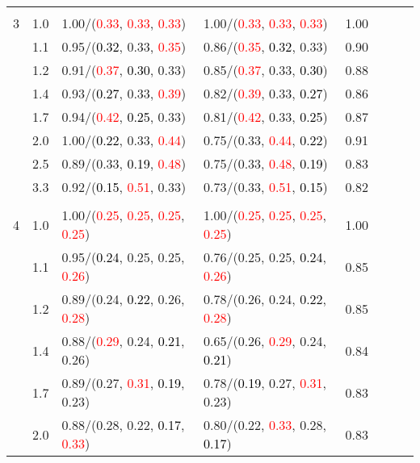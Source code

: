 \documentclass[10pt,a4paper]{report}
\begin{document}
\begin{table}[!htbp]
\begin{center}
{\begin{tabular}{ccllcccc}
			&&&&\\
			3			&1.0&1.00/(\textcolor{red}{0.33}, \textcolor{red}{0.33}, \textcolor{red}{0.33})&1.00/(\textcolor{red}{0.33}, \textcolor{red}{0.33}, \textcolor{red}{0.33})&1.00\\
			&1.1&0.95/(\textcolor{black}{0.32}, 0.33, \textcolor{red}{0.35})&0.86/(\textcolor{red}{0.35}, \textcolor{black}{0.32}, 0.33)&0.90\\
			&1.2&0.91/(\textcolor{red}{0.37}, \textcolor{black}{0.30}, 0.33)&0.85/(\textcolor{red}{0.37}, 0.33, \textcolor{black}{0.30})&0.88\\
			&1.4&0.93/(\textcolor{black}{0.27}, 0.33, \textcolor{red}{0.39})&0.82/(\textcolor{red}{0.39}, 0.33, \textcolor{black}{0.27})&0.86\\
			&1.7&0.94/(\textcolor{red}{0.42}, \textcolor{black}{0.25}, 0.33)&0.81/(\textcolor{red}{0.42}, 0.33, \textcolor{black}{0.25})&0.87\\
			&2.0&1.00/(\textcolor{black}{0.22}, 0.33, \textcolor{red}{0.44})&0.75/(0.33, \textcolor{red}{0.44}, \textcolor{black}{0.22})&0.91\\
			&2.5&0.89/(0.33, \textcolor{black}{0.19}, \textcolor{red}{0.48})&0.75/(0.33, \textcolor{red}{0.48}, \textcolor{black}{0.19})&0.83\\
			&3.3&0.92/(\textcolor{black}{0.15}, \textcolor{red}{0.51}, 0.33)&0.73/(0.33, \textcolor{red}{0.51}, \textcolor{black}{0.15})&0.82\\
			&&&&\\
			4			&1.0&1.00/(\textcolor{red}{0.25}, \textcolor{red}{0.25}, \textcolor{red}{0.25}, \textcolor{red}{0.25})&1.00/(\textcolor{red}{0.25}, \textcolor{red}{0.25}, \textcolor{red}{0.25}, \textcolor{red}{0.25})&1.00\\
			&1.1&0.95/(\textcolor{black}{0.24}, 0.25, 0.25, \textcolor{red}{0.26})&0.76/(0.25, 0.25, \textcolor{black}{0.24}, \textcolor{red}{0.26})&0.85\\
			&1.2&0.89/(0.24, \textcolor{black}{0.22}, 0.26, \textcolor{red}{0.28})&0.78/(0.26, 0.24, \textcolor{black}{0.22}, \textcolor{red}{0.28})&0.85\\
			&1.4&0.88/(\textcolor{red}{0.29}, 0.24, \textcolor{black}{0.21}, 0.26)&0.65/(0.26, \textcolor{red}{0.29}, 0.24, \textcolor{black}{0.21})&0.84\\
			&1.7&0.89/(0.27, \textcolor{red}{0.31}, \textcolor{black}{0.19}, 0.23)&0.78/(\textcolor{black}{0.19}, 0.27, \textcolor{red}{0.31}, 0.23)&0.83\\
			&2.0&0.88/(0.28, 0.22, \textcolor{black}{0.17}, \textcolor{red}{0.33})&0.80/(0.22, \textcolor{red}{0.33}, 0.28, \textcolor{black}{0.17})&0.83\\

\end{tabular}}
\end{center}
\end{table}
\end{document}
